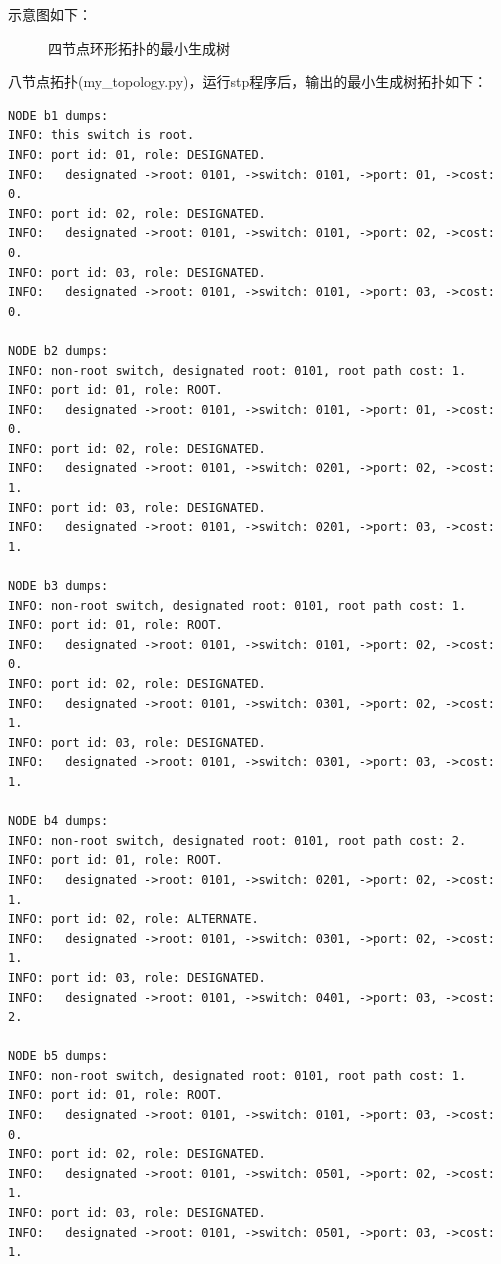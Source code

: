 \documentclass[11pt]{article}
\begin{document}
示意图如下：
\begin{figure}[H]
\centering
{}
\caption{四节点环形拓扑的最小生成树}
\label{fig:four_node_ring}
\end{figure}

八节点拓扑(my_topology.py)，运行stp程序后，输出的最小生成树拓扑如下：
\begin{lstlisting}
NODE b1 dumps:
INFO: this switch is root.
INFO: port id: 01, role: DESIGNATED.
INFO: 	designated ->root: 0101, ->switch: 0101, ->port: 01, ->cost: 0.
INFO: port id: 02, role: DESIGNATED.
INFO: 	designated ->root: 0101, ->switch: 0101, ->port: 02, ->cost: 0.
INFO: port id: 03, role: DESIGNATED.
INFO: 	designated ->root: 0101, ->switch: 0101, ->port: 03, ->cost: 0.

NODE b2 dumps:
INFO: non-root switch, designated root: 0101, root path cost: 1.
INFO: port id: 01, role: ROOT.
INFO: 	designated ->root: 0101, ->switch: 0101, ->port: 01, ->cost: 0.
INFO: port id: 02, role: DESIGNATED.
INFO: 	designated ->root: 0101, ->switch: 0201, ->port: 02, ->cost: 1.
INFO: port id: 03, role: DESIGNATED.
INFO: 	designated ->root: 0101, ->switch: 0201, ->port: 03, ->cost: 1.

NODE b3 dumps:
INFO: non-root switch, designated root: 0101, root path cost: 1.
INFO: port id: 01, role: ROOT.
INFO: 	designated ->root: 0101, ->switch: 0101, ->port: 02, ->cost: 0.
INFO: port id: 02, role: DESIGNATED.
INFO: 	designated ->root: 0101, ->switch: 0301, ->port: 02, ->cost: 1.
INFO: port id: 03, role: DESIGNATED.
INFO: 	designated ->root: 0101, ->switch: 0301, ->port: 03, ->cost: 1.

NODE b4 dumps:
INFO: non-root switch, designated root: 0101, root path cost: 2.
INFO: port id: 01, role: ROOT.
INFO: 	designated ->root: 0101, ->switch: 0201, ->port: 02, ->cost: 1.
INFO: port id: 02, role: ALTERNATE.
INFO: 	designated ->root: 0101, ->switch: 0301, ->port: 02, ->cost: 1.
INFO: port id: 03, role: DESIGNATED.
INFO: 	designated ->root: 0101, ->switch: 0401, ->port: 03, ->cost: 2.

NODE b5 dumps:
INFO: non-root switch, designated root: 0101, root path cost: 1.
INFO: port id: 01, role: ROOT.
INFO: 	designated ->root: 0101, ->switch: 0101, ->port: 03, ->cost: 0.
INFO: port id: 02, role: DESIGNATED.
INFO: 	designated ->root: 0101, ->switch: 0501, ->port: 02, ->cost: 1.
INFO: port id: 03, role: DESIGNATED.
INFO: 	designated ->root: 0101, ->switch: 0501, ->port: 03, ->cost: 1.


\end{lstlisting}
\end{document}
